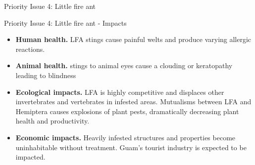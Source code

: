 \documentclass[]{beamer}
\begin{document}
%

\begin{frame}{Priority Issue 4: Little fire ant}	
	\begin{figure}
	\end{figure}
\end{frame}

\begin{frame}{Priority Issue 4: Little fire ant - Impacts}	
	\begin{itemize}
		\item \textbf{Human health.} LFA stings cause painful welts and produce varying allergic reactions. 
		\item \textbf{Animal health.} stings to animal eyes cause a clouding or keratopathy leading to blindness
		\item \textbf{Ecological impacts.} LFA is highly competitive and displaces other invertebrates and vertebrates in infested areas. Mutualisms between LFA and Hemiptera causes explosions of plant pests, dramatically decreasing plant health and productivity.
		\item \textbf{Economic impacts.} Heavily infested structures and properties become uninhabitable without treatment. Guam's tourist industry is expected to be impacted.				
	\end{itemize}
\end{frame}
\end{document}
